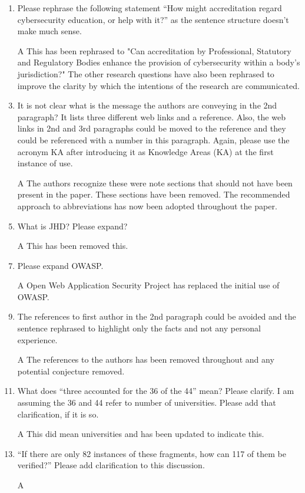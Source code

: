 \documentclass{article}
\begin{document}
\begin{enumerate}
\item Please rephrase the following statement ``How might accreditation regard cybersecurity education, or help with it?'' as the sentence structure doesn't make much sense. 
\item[A] This has been rephrased to "Can accreditation by Professional, Statutory and Regulatory Bodies enhance the provision of cybersecurity within a body's jurisdiction?" The other research questions have also been rephrased to improve the clarity by which the intentions of the research are communicated.
\item It is not clear what is the message the authors are conveying in the 2nd paragraph? It lists three different web links and a reference. Also, the web links in 2nd and 3rd paragraphs could be moved to the reference and they could be referenced with a number in this paragraph. 
Again, please use the acronym KA after introducing it as Knowledge Areas (KA) at the first instance of use. 


\item[A] The authors recognize these were note sections that should not have been present in the paper. These sections have been removed. The recommended approach to abbreviations has now been adopted throughout the paper.
\item  What is JHD? Please expand?
\item[A] This has been removed this. 
\item Please expand OWASP. 
\item[A]Open Web Application Security Project has replaced the initial use of OWASP.
\item 
The references to first author in the 2nd paragraph could be avoided and the sentence rephrased to highlight only the facts and not any personal experience. 
\item[A] The references to the authors has been removed throughout and any potential conjecture removed.
\item 
 What does ``three accounted for the 36 of the 44'' mean? Please clarify. I am assuming the 36 and 44 refer to number of universities. Please add that clarification, if it is so.
\item[A] This did mean universities and has been updated to indicate this.
\item 
``If there are only 82 instances of these fragments, how can 117 of them be verified?'' Please add clarification to this discussion.
\item[A]
\end{enumerate}
\end{document}
